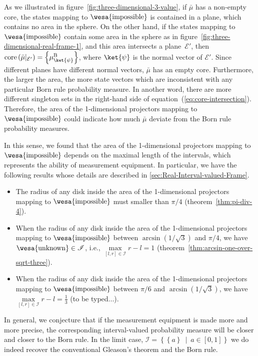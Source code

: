 \documentclass[12pt]{iopart}
\theoremstyle{plain}
\theoremstyle{definition}
\theoremstyle{remark}
\newcommand{\events}{\ensuremath{\mathcal{E}}}
\newcommand{\imposs}{{\mbox{\wesa{impossible}}}}
\newcommand{\unknown}{{\mbox{\wesa{unknown}}}}
\newcommand{\set}[2]{\ensuremath{\left\{ {#1}~\middle|~{#2}\right\} }}
\begin{document}
As we illustrated in figure~\ref{fig:three-dimensional-3-value},
if $\bar{\mu}$ has a non-empty core, the states mapping to $\imposs$
is contained in a plane, which contains no area in the sphere. On
the other hand, if the states mapping to $\imposs$ contain some area
in the sphere as in figure~\ref{fig:three-dimensional-real-frame-1},
and this area intersects a plane~$\events'$, then $\mathrm{core}\left(\bar{\mu}|_{\events'}\right)=\left\{ \mu_{\ket{\psi}}^{\mathrm{B}}\right\} $,
where $\ket{\psi}$ is the normal vector of $\events'$. Since different
planes have different normal vectors, $\bar{\mu}$ has an empty core.
Furthermore, the larger the area, the more state vectors which are
inconsistent with any particular Born rule probability measure. In
another word, there are more different singleton sets in the right-hand
side of equation~(\ref{eq:core-intersection}). Therefore, the area
of the 1-dimensional projectors mapping to $\imposs$ could indicate
how much $\bar{\mu}$ deviate from the Born rule probability measures.

In this sense, we found that the area of the 1-dimensional projectors
mapping to $\imposs$ depends on the maximal length of the intervals,
which represents the ability of measurement equipment. In particular,
we have the following results whose details are described in \ref{sec:Real-Interval-valued-Frame}. 
\begin{itemize}
\item The radius of any disk inside the area of the 1-dimensional projectors
mapping to $\imposs$ must smaller than $\pi / 4$ (theorem~\ref{thm:pi-div-4}).
\item When the radius of any disk inside the area of the 1-dimensional projectors
mapping to $\imposs$ between $\arcsin\left(1 / \sqrt{3}\right)$
and $\pi / 4$, we have $\unknown\in\mathscr{I}$, i.e., $\underset{\left[l,r\right]\in\mathscr{I}}{\max}r-l=1$
(theorem~\ref{thm:arcsin-one-over-sqrt-three}).
\item When the radius of any disk inside the area of the 1-dimensional projectors
mapping to $\imposs$ between $\pi/6$ and $\arcsin\left(1 / \sqrt{3}\right)$,
we have $\underset{\left[l,r\right]\in\mathscr{I}}{\max}r-l=\frac{1}{3}$
(to be typed...).
\end{itemize}
In general, we conjecture that if the measurement equipment is made
more and more precise, the corresponding interval-valued probability
measure will be closer and closer to the Born rule. In the limit case,
$\mathscr{I}=\set{\left\{ a\right\} }{a\in\left[0,1\right]}$ we do
indeed recover the conventional Gleason's theorem and the Born rule.
\end{document}

